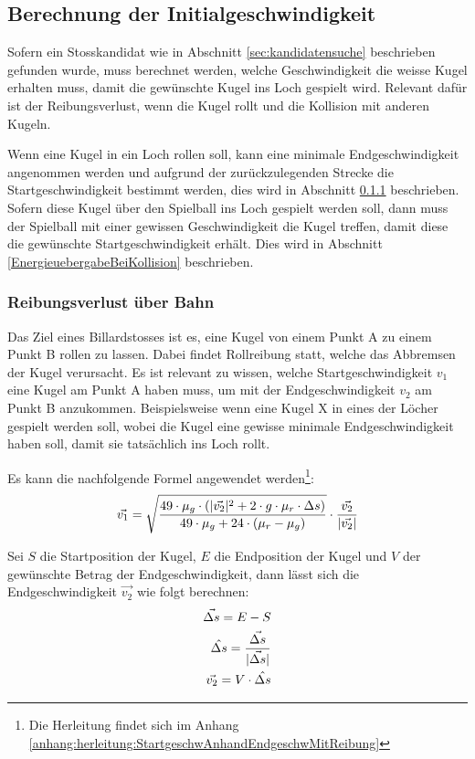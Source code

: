 \subsection{Berechnung der Initialgeschwindigkeit}\label{sec:initialgeschwindigkeit}
Sofern ein Stosskandidat wie in Abschnitt \ref{sec:kandidatensuche} beschrieben gefunden wurde, muss berechnet werden,
welche Geschwindigkeit die weisse Kugel erhalten muss, damit die gewünschte Kugel ins Loch gespielt wird.
Relevant dafür ist der Reibungsverlust, wenn die Kugel rollt und die Kollision mit anderen Kugeln.

Wenn eine Kugel in ein Loch rollen soll, kann eine minimale Endgeschwindigkeit angenommen werden und aufgrund
der zurückzulegenden Strecke die Startgeschwindigkeit bestimmt werden, dies wird in Abschnitt \ref{ReibungsverlustUeberBahn} beschrieben.
Sofern diese Kugel über den Spielball ins Loch gespielt werden soll, dann muss der Spielball mit einer gewissen
Geschwindigkeit die Kugel treffen, damit diese die gewünschte Startgeschwindigkeit erhält. Dies wird in Abschnitt \ref{EnergieuebergabeBeiKollision} beschrieben.

\subsubsection{Reibungsverlust über Bahn}\label{ReibungsverlustUeberBahn}
Das Ziel eines Billardstosses ist es, eine Kugel von einem Punkt A zu einem Punkt B rollen zu lassen.
Dabei findet Rollreibung statt, welche das Abbremsen der Kugel verursacht.
Es ist relevant zu wissen, welche Startgeschwindigkeit $v_1$ eine Kugel am Punkt A haben muss,
um mit der Endgeschwindigkeit $v_2$ am Punkt B anzukommen.
Beispielsweise wenn eine Kugel X in eines der Löcher gespielt werden soll,
wobei die Kugel eine gewisse minimale Endgeschwindigkeit haben soll, damit sie tatsächlich ins Loch rollt.

Es kann die nachfolgende Formel angewendet werden\footnote{Die Herleitung findet sich im Anhang \ref{anhang:herleitung:StartgeschwAnhandEndgeschwMitReibung}}:
\begin{align}
    \vec{v_1} = \sqrt{\frac{49 \cdot \mu_g \cdot (\lvert \vec{v_2} \rvert^2 + 2 \cdot g \cdot \mu_r \cdot \Delta s)}{49 \cdot \mu_g + 24 \cdot (\mu_r - \mu_g)}} \cdot \frac{\vec{v_2}}{\lvert \vec{v_2} \rvert}
\end{align}

Sei $S$ die Startposition der Kugel, $E$ die Endposition der Kugel und $V$ der gewünschte Betrag der Endgeschwindigkeit,
dann lässt sich die Endgeschwindigkeit $\vec{v_2}$ wie folgt berechnen:
\begin{align}
    \vec{\Delta s} = E - S\\
    \hat{\Delta s} = \frac{\vec{\Delta s}}{\lvert \vec{\Delta s} \rvert}\\
    \vec{v_2} = V \cdot \hat{\Delta s}
\end{align}

